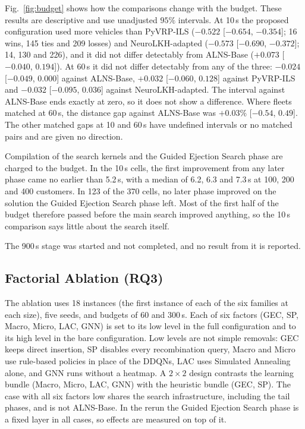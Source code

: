 \documentclass{ieeeaccess}
\begin{document}
Fig.~\ref{fig:budget} shows how the comparisons change with the budget. These results are descriptive and use unadjusted $95\%$ intervals. At 10\,s the proposed configuration used more vehicles than PyVRP-ILS ($-0.522$ [$-0.654$, $-0.354$]; 16 wins, 145 ties and 209 losses) and NeuroLKH-adapted ($-0.573$ [$-0.690$, $-0.372$]; 14, 130 and 226), and it did not differ detectably from ALNS-Base ($+0.073$ [$-0.040$, $0.194$]). At 60\,s it did not differ detectably from any of the three: $-0.024$ [$-0.049$, $0.000$] against ALNS-Base, $+0.032$ [$-0.060$, $0.128$] against PyVRP-ILS and $-0.032$ [$-0.095$, $0.036$] against NeuroLKH-adapted. The interval against ALNS-Base ends exactly at zero, so it does not show a difference. Where fleets matched at 60\,s, the distance gap against ALNS-Base was $+0.03\%$ [$-0.54$, $0.49$]. The other matched gaps at 10 and 60\,s have undefined intervals or no matched pairs and are given no direction.

Compilation of the search kernels and the Guided Ejection Search phase are charged to the budget. In the 10\,s cells, the first improvement from any later phase came no earlier than 5.2\,s, with a median of 6.2, 6.3 and 7.3\,s at 100, 200 and 400 customers. In 123 of the 370 cells, no later phase improved on the solution the Guided Ejection Search phase left. Most of the first half of the budget therefore passed before the main search improved anything, so the 10\,s comparison says little about the search itself.

The 900\,s stage was started and not completed, and no result from it is reported.

\subsection{Factorial Ablation (RQ3)}
\label{sec:ablation_results}
The ablation uses 18 instances (the first instance of each of the six families at each size), five seeds, and budgets of 60 and 300\,s. Each of six factors (GEC, SP, Macro, Micro, LAC, GNN) is set to its low level in the full configuration and to its high level in the bare configuration. Low levels are not simple removals: GEC keeps direct insertion, SP disables every recombination query, Macro and Micro use rule-based policies in place of the DDQNs, LAC uses Simulated Annealing alone, and GNN runs without a heatmap. A $2\times2$ design contrasts the learning bundle (Macro, Micro, LAC, GNN) with the heuristic bundle (GEC, SP). The case with all six factors low shares the search infrastructure, including the tail phases, and is not ALNS-Base. In the rerun the Guided Ejection Search phase is a fixed layer in all cases, so effects are measured on top of it.
\end{document}
